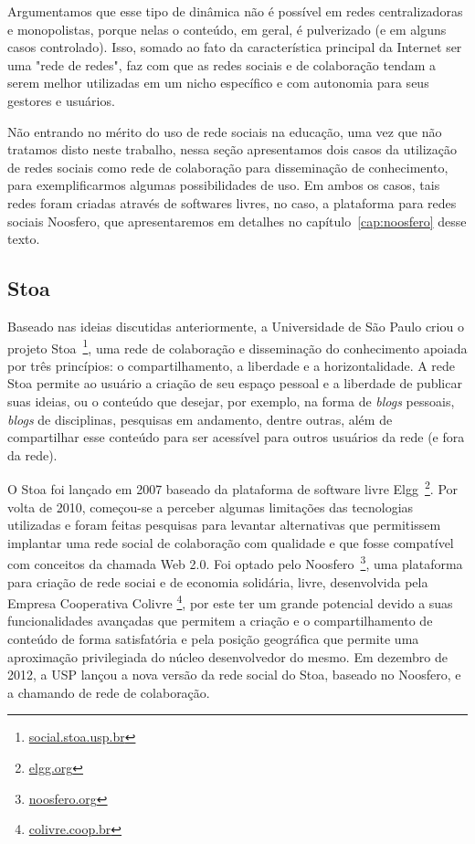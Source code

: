 Argumentamos que esse tipo de dinâmica não é possível em redes centralizadoras e monopolistas,
porque nelas o conteúdo, em geral, é pulverizado (e em alguns casos controlado).
Isso, somado ao fato da característica principal da Internet ser uma "rede de redes",
faz com que as redes sociais e de colaboração tendam a serem melhor utilizadas
em um nicho específico e com autonomia para seus gestores e usuários.

Não entrando no mérito do uso de rede sociais na educação, uma vez que não tratamos disto neste trabalho,
nessa seção apresentamos dois casos da utilização de redes sociais como rede de
colaboração para disseminação de conhecimento, para exemplificarmos algumas possibilidades de uso.
%
Em ambos os casos, tais redes foram criadas através de softwares livres, no caso, a  plataforma para 
redes sociais Noosfero, que apresentaremos em detalhes no capítulo~\ref{cap:noosfero} desse texto.

\subsection{Stoa}

Baseado nas ideias discutidas anteriormente, a Universidade de São Paulo criou o
projeto Stoa~\footnote{\url{social.stoa.usp.br}}, uma rede de colaboração e
disseminação do conhecimento apoiada por três princípios: o compartilhamento, a
liberdade e a horizontalidade.
%
A rede Stoa permite ao usuário a criação de seu espaço pessoal e a liberdade de
publicar suas ideias, ou o conteúdo que desejar, por exemplo, na forma de
\textit{blogs} pessoais, \textit{blogs} de disciplinas, pesquisas em andamento,
dentre outras, além de compartilhar esse conteúdo para ser acessível
para outros usuários da rede (e fora da rede).

O Stoa foi lançado em 2007 baseado da plataforma de software livre
Elgg~\footnote{\url{elgg.org}}.
%
Por volta de 2010, começou-se a perceber algumas limitações das tecnologias
utilizadas e foram feitas pesquisas para levantar alternativas que permitissem
implantar uma rede social de colaboração com qualidade e que fosse compatível
com conceitos da chamada Web 2.0.
%
Foi optado pelo Noosfero~\footnote{\url{noosfero.org}}, uma plataforma para
criação de rede sociai e de economia solidária, livre, desenvolvida pela
Empresa Cooperativa Colivre \footnote{\url{colivre.coop.br}}, por este ter um
grande potencial devido a suas funcionalidades avançadas que permitem a criação
e o compartilhamento de conteúdo de forma satisfatória e pela posição geográfica
que permite uma aproximação privilegiada do núcleo desenvolvedor do mesmo.
%
Em dezembro de 2012, a USP lançou a nova versão da rede social do Stoa, baseado
no Noosfero, e a chamando de rede de colaboração.

